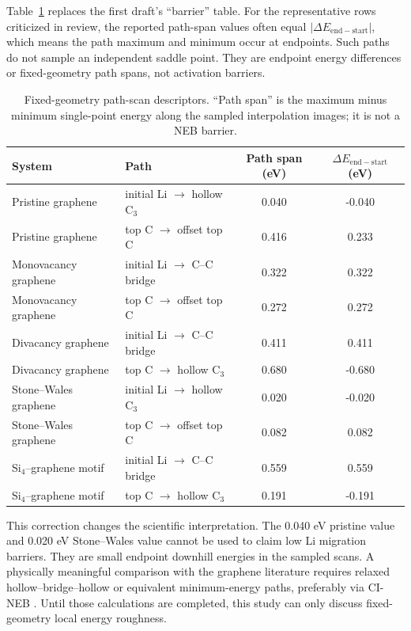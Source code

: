 \documentclass[12pt]{article}
\begin{document}
Table~\ref{tab:path_scans} replaces the first draft's ``barrier'' table. For the representative rows criticized in review, the reported path-span values often equal $|\Delta E_{\mathrm{end-start}}|$, which means the path maximum and minimum occur at endpoints. Such paths do not sample an independent saddle point. They are endpoint energy differences or fixed-geometry path spans, not activation barriers.

\begin{table}[!t]
  \centering
  \caption{Fixed-geometry path-scan descriptors. ``Path span'' is the maximum minus minimum single-point energy along the sampled interpolation images; it is not a NEB barrier.}
  \label{tab:path_scans}
  \begin{tabular}{llcc}
    \toprule
    System & Path & Path span (eV) & $\Delta E_{\mathrm{end-start}}$ (eV) \\
    \midrule
    Pristine graphene & initial Li $\rightarrow$ hollow C$_3$ & 0.040 & -0.040 \\
    Pristine graphene & top C $\rightarrow$ offset top C & 0.416 & 0.233 \\
    Monovacancy graphene & initial Li $\rightarrow$ C--C bridge & 0.322 & 0.322 \\
    Monovacancy graphene & top C $\rightarrow$ offset top C & 0.272 & 0.272 \\
    Divacancy graphene & initial Li $\rightarrow$ C--C bridge & 0.411 & 0.411 \\
    Divacancy graphene & top C $\rightarrow$ hollow C$_3$ & 0.680 & -0.680 \\
    Stone--Wales graphene & initial Li $\rightarrow$ hollow C$_3$ & 0.020 & -0.020 \\
    Stone--Wales graphene & top C $\rightarrow$ offset top C & 0.082 & 0.082 \\
    Si$_4$--graphene motif & initial Li $\rightarrow$ C--C bridge & 0.559 & 0.559 \\
    Si$_4$--graphene motif & top C $\rightarrow$ hollow C$_3$ & 0.191 & -0.191 \\
    \bottomrule
  \end{tabular}
\end{table}

This correction changes the scientific interpretation. The 0.040 eV pristine value and 0.020 eV Stone--Wales value cannot be used to claim low Li migration barriers. They are small endpoint downhill energies in the sampled scans. A physically meaningful comparison with the graphene literature requires relaxed hollow--bridge--hollow or equivalent minimum-energy paths, preferably via CI-NEB \citep{uthaisar2010edge,zhou2012graphene,henkelman2000neb}. Until those calculations are completed, this study can only discuss fixed-geometry local energy roughness.
\end{document}
